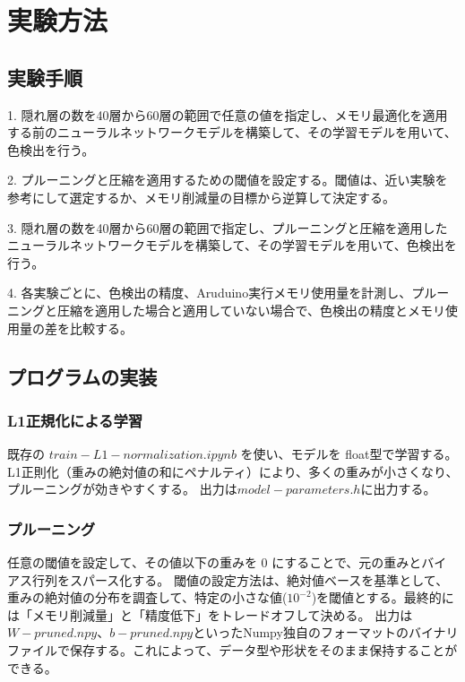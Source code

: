 \documentclass[uplatex,dvipdfmx]{jsarticle}
\begin{document}
\section{実験方法}
\subsection{実験手順}
1. 隠れ層の数を40層から60層の範囲で任意の値を指定し、メモリ最適化を適用する前のニューラルネットワークモデルを構築して、その学習モデルを用いて、色検出を行う。\par
2. プルーニングと圧縮を適用するための閾値を設定する。閾値は、近い実験を参考にして選定するか、メモリ削減量の目標から逆算して決定する。\par
3. 隠れ層の数を40層から60層の範囲で指定し、プルーニングと圧縮を適用したニューラルネットワークモデルを構築して、その学習モデルを用いて、色検出を行う。\par
4. 各実験ごとに、色検出の精度、Aruduino実行メモリ使用量を計測し、プルーニングと圧縮を適用した場合と適用していない場合で、色検出の精度とメモリ使用量の差を比較する。\par
\subsection{プログラムの実装}
\subsubsection{L1正規化による学習}
既存の $train-L1-normalization.ipynb$ を使い、モデルを float型で学習する。L1正則化（重みの絶対値の和にペナルティ）により、多くの重みが小さくなり、プルーニングが効きやすくする。
出力は$model-parameters.h$に出力する。
\subsubsection{プルーニング}
任意の閾値を設定して、その値以下の重みを 0 にすることで、元の重みとバイアス行列をスパース化する。
閾値の設定方法は、絶対値ベースを基準として、重みの絶対値の分布を調査して、特定の小さな値($10^{-2}$)を閾値とする。最終的には「メモリ削減量」と「精度低下」をトレードオフして決める。
出力は$W-pruned.npy、b-pruned.npy$といったNumpy独自のフォーマットのバイナリファイルで保存する。これによって、データ型や形状をそのまま保持することができる。
\end{document}
